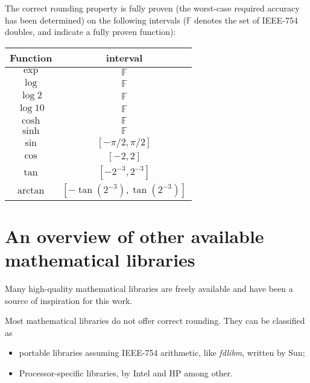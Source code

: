 The correct rounding property is fully proven (the worst-case required
accuracy has been determined) on the following intervals ($\mathbb{F}$
denotes the set of IEEE-754 doubles, and indicate a fully proven
function):

\begin{center}
  \begin{tabular}{|c|c|}
    \hline
    Function & interval\\
    \hline
    \hline
    $\exp$ & $\mathbb{F}$  \\
    \hline
    $\log$ & $\mathbb{F}$  \\
    \hline
    $\log2$ & $\mathbb{F}$  \\
    \hline
    $\log10$ & $\mathbb{F}$  \\
    \hline
    $\cosh$ & $\mathbb{F}$  \\
    \hline
    $\sinh$ & $\mathbb{F}$  \\
    \hline
    $\sin$  & $[-\pi/2, \pi/2]$  \\
    \hline
    $\cos$  & $[-2, 2]$  \\
    \hline
    $\tan$  & $[-2^{-3}, 2^{-3}]$  \\
    \hline
    $\arctan$  & $[-\tan(2^{-3}), \tan(2^{-3})]$ \\
    \hline
  \end{tabular}

\end{center}

\section{An overview of other  available mathematical libraries\label{section:lib-overview}}

Many high-quality mathematical libraries are freely available and have
been a source of inspiration for this work.

Most mathematical libraries do not offer correct rounding. They can be classified as 
\begin{itemize}
\item portable libraries  assuming IEEE-754
  arithmetic, like \emph{fdlibm}, written by Sun\cite{FDLIBMweb};
\item  Processor-specific libraries, by
  Intel\cite{HarKubStoTan99,IntelOpenSource} and
  HP\cite{Markstein2000,Markstein2001} among other.
\end{itemize}

